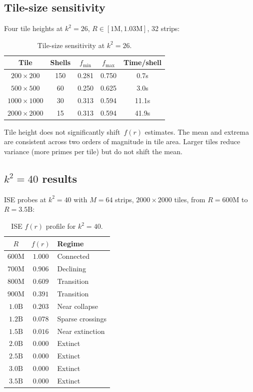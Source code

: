 \documentclass[11pt,a4paper]{article}
\newcommand{\fr}{f(r)}
\theoremstyle{definition}
\theoremstyle{plain}
\theoremstyle{remark}
\begin{document}
\subsection{Tile-size sensitivity}

Four tile heights at $k^2 = 26$, $R \in [1\text{M}, 1.03\text{M}]$, 32 strips:

\begin{table}[ht]
\centering
\begin{tabular}{@{}ccccc@{}}
\toprule
Tile & Shells & $f_{\min}$ & $f_{\max}$ & Time/shell \\
\midrule
$200 \times 200$   & 150 & 0.281 & 0.750 & 0.7s \\
$500 \times 500$   & 60  & 0.250 & 0.625 & 3.0s \\
$1000 \times 1000$ & 30  & 0.313 & 0.594 & 11.1s \\
$2000 \times 2000$ & 15  & 0.313 & 0.594 & 41.9s \\
\bottomrule
\end{tabular}
\caption{Tile-size sensitivity at $k^2 = 26$.}
\label{tab:tile-sensitivity}
\end{table}

Tile height does not significantly shift~$\fr$ estimates.  The mean and extrema are consistent across two orders of magnitude in tile area.  Larger tiles reduce variance (more primes per tile) but do not shift the mean.

\subsection{\texorpdfstring{$k^2 = 40$}{k\texttwosuperior\ = 40} results}\label{sec:k40-results}

ISE probes at $k^2 = 40$ with $M = 64$ strips, $2000 \times 2000$ tiles, from $R = 600\text{M}$ to $R = 3.5\text{B}$:

\begin{table}[ht]
\centering
\begin{tabular}{@{}ccl@{}}
\toprule
$R$ & $\fr$ & Regime \\
\midrule
$600\text{M}$ & $1.000$ & Connected \\
$700\text{M}$ & $0.906$ & Declining \\
$800\text{M}$ & $0.609$ & Transition \\
$900\text{M}$ & $0.391$ & Transition \\
$1.0\text{B}$ & $0.203$ & Near collapse \\
$1.2\text{B}$ & $0.078$ & Sparse crossings \\
$1.5\text{B}$ & $0.016$ & Near extinction \\
$2.0\text{B}$ & $0.000$ & Extinct \\
$2.5\text{B}$ & $0.000$ & Extinct \\
$3.0\text{B}$ & $0.000$ & Extinct \\
$3.5\text{B}$ & $0.000$ & Extinct \\
\bottomrule
\end{tabular}
\caption{ISE $\fr$ profile for $k^2 = 40$.}
\label{tab:k40-results}
\end{table}
\end{document}
